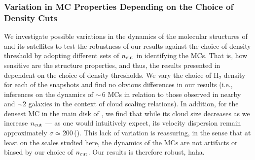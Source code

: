 \documentclass[apj]{emulateapj} %
\begin{document}
\subsubsection{Variation in MC Properties Depending on the Choice of Density Cuts}	 \label{sec:ncut}
We investigate possible variations in the dynamics of the molecular structures of \flower and its satellites 
to test 
the robustness of our results against the choice of density threshold by adopting 
different sets of $n_{\rm cut}$ in identifying the MCs.
That is, how sensitive are the structure properties, and thus, the results presented in 
dependent on the choice of density thresholds.
We vary the choice of H$_2$ density for each of the snapshots and 
find no obvious differences in our results (i.e., inferences on the dynamics of \z$\sim$\,6 
MCs in relation to those observed in nearby and \z$\sim$2 galaxies in the context of 
cloud scaling relations). 
In addition, for the densest MC in the main disk of \flower, we find that while 
its cloud size decreases as we increase $n_{\rm cut}$ --- as one would intuitively expect, 
its velocity dispersion remain 
approximately $\sigma\simeq$200\,\kms (). 
This lack of variation is reassuring, in the sense that at least on the scales studied here, 
the dynamics of the MCs are not artifacts or biased by our choice of $n_{\rm cut}$.
Our results is therefore robust, haha.

\end{document}
